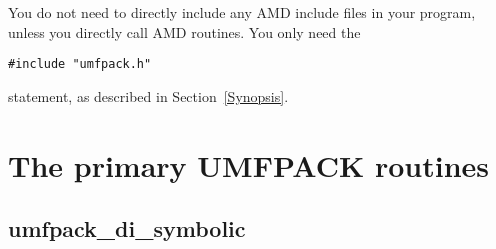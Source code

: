 \documentclass[11pt]{article}
\begin{document}
You do not need to directly include any AMD include files in your
program, unless you directly call AMD routines.  You only need the
\begin{verbatim}
#include "umfpack.h"
\end{verbatim}
statement, as described in Section~\ref{Synopsis}.

\newpage
\section{The primary UMFPACK routines}
\label{Primary}

\subsection{umfpack\_di\_symbolic}
\end{document}
